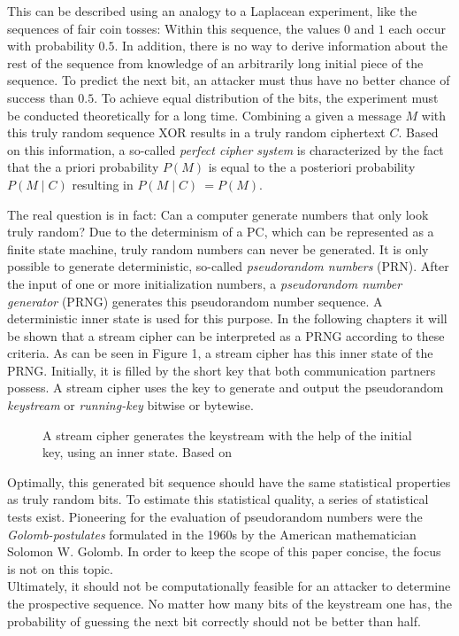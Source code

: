 This can be described using an analogy to a Laplacean experiment, like the sequences of fair coin tosses: Within this sequence, the values $0$ and $1$ each occur with probability $0.5$. In addition, there is no way to derive information about the rest of the sequence from knowledge of an arbitrarily long initial piece of the sequence. To predict the next bit, an attacker must thus have no better chance of success than $0.5$. To achieve equal distribution of the bits, the experiment must be conducted theoretically for a long time. Combining a given a message $M$ with this truly random sequence XOR results in a truly random ciphertext $C$. Based on this information, a so-called \textit{perfect cipher system} is characterized by the fact that the a priori probability $P\left(M\right)$ is equal to the a posteriori probability $P({M}\mid{C})$ resulting in $P({M}\mid{C})\ = P({M})$. \cite[pp. 52-23]{Ertel.2020}

\pagebreak

The real question is in fact: Can a computer generate numbers that only look truly random? Due to the determinism of a PC, which can be represented as a finite state machine, truly random numbers can never be generated. It is only possible to generate deterministic, so-called \textit{pseudorandom numbers} (PRN). After the input of one or more initialization numbers, a \textit{pseudorandom number generator} (PRNG) generates this pseudorandom number sequence. A deterministic inner state is used for this purpose. \cite[pp. 195-196]{Ertel.2020} In the following chapters it will be shown that a stream cipher can be interpreted as a PRNG according to these criteria. As can be seen in Figure 1, a stream cipher has this inner state of the PRNG. Initially, it is filled by the short key that both communication partners possess. A stream cipher uses the key to generate and output the pseudorandom \textit{keystream} or \textit{running-key} bitwise or bytewise. \cite[p. 233]{Schneier.2006} \\

\begin{figure}[h]
	\centering
	
	\caption{A stream cipher generates the keystream with the help of the initial key, using an inner state. Based on \cite[p. 234]{Schneier.2006}}
	\label{fig:Figure_2}
\end{figure}

Optimally, this generated bit sequence should have the same statistical properties as truly random bits. To estimate this statistical quality, a series of statistical tests exist. Pioneering for the evaluation of pseudorandom numbers were the \textit{Golomb-postulates} formulated in the 1960s by the American mathematician Solomon W. Golomb. \cite[p. 43]{Golomb.1967} In order to keep the scope of this paper concise, the focus is not on this topic.\\

Ultimately, it should not be computationally feasible for an attacker to determine the prospective  sequence. No matter how many bits of the keystream one has, the probability of guessing the next bit correctly should not be better than half.
